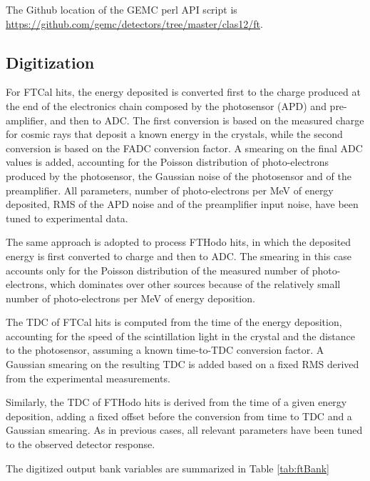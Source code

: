 The Github location of the GEMC perl API script is \url{https://github.com/gemc/detectors/tree/master/clas12/ft}.


\subsection{Digitization}

For FTCal hits, the energy deposited is converted first to the charge produced at the end of the electronics chain composed
by the photosensor (APD) and pre-amplifier, and then to ADC.
The first conversion is based on the measured charge for cosmic rays that deposit a known energy in the crystals,
while the second conversion is based on the FADC conversion factor. A smearing on the final ADC values is added,
accounting for the Poisson distribution of photo-electrons produced by the photosensor, the Gaussian noise of the
photosensor and of the preamplifier. All parameters, number of photo-electrons per MeV of energy deposited, RMS of the
APD noise and of the preamplifier input noise, have been tuned to experimental data.

The same approach is adopted to process FTHodo hits, in which the deposited energy is first converted to charge and then to ADC.
The smearing in this case accounts only for the Poisson distribution of the measured number of photo-electrons,
which dominates over other sources because of the relatively small number of photo-electrons per MeV of energy deposition.

The TDC of FTCal hits is computed from the time of the energy deposition, accounting for the speed of the scintillation light in
the crystal and the distance to the photosensor, assuming a known time-to-TDC conversion factor. A Gaussian smearing on the
resulting TDC is added based on a fixed RMS derived from the experimental measurements.

Similarly, the TDC of FTHodo hits is derived from the time of a given energy deposition, adding a fixed offset before the
conversion from time to TDC and a Gaussian smearing. As in previous cases, all relevant parameters have been tuned to the
observed detector response.

The digitized output bank variables are summarized in Table \ref{tab:ftBank}

